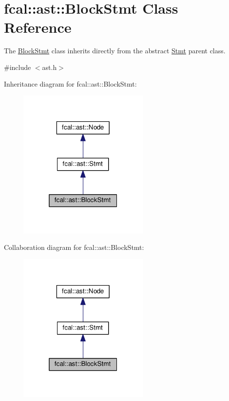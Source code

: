 \hypertarget{classfcal_1_1ast_1_1BlockStmt}{}\section{fcal\+:\+:ast\+:\+:Block\+Stmt Class Reference}
\label{classfcal_1_1ast_1_1BlockStmt}


The \hyperlink{classfcal_1_1ast_1_1BlockStmt}{Block\+Stmt} class inherits directly from the abstract \hyperlink{classfcal_1_1ast_1_1Stmt}{Stmt} parent class.  




{\ttfamily \#include $<$ast.\+h$>$}



Inheritance diagram for fcal\+:\+:ast\+:\+:Block\+Stmt\+:
\nopagebreak
\begin{figure}[H]
\begin{center}
\leavevmode
\includegraphics[width=184pt]{classfcal_1_1ast_1_1BlockStmt__inherit__graph}
\end{center}
\end{figure}


Collaboration diagram for fcal\+:\+:ast\+:\+:Block\+Stmt\+:
\nopagebreak
\begin{figure}[H]
\begin{center}
\leavevmode
\includegraphics[width=184pt]{classfcal_1_1ast_1_1BlockStmt__coll__graph}
\end{center}
\end{figure}
